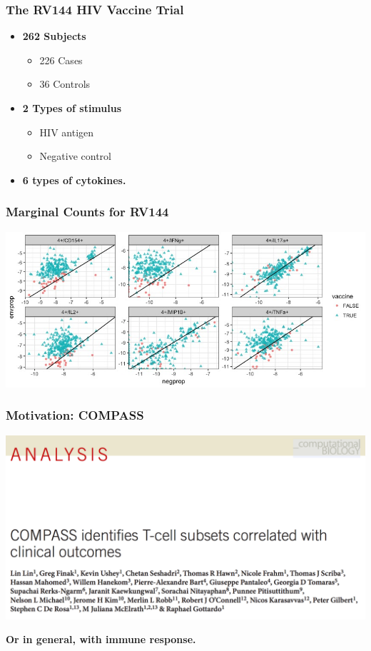 \documentclass{beamer}
\theoremstyle{definition}
\begin{document}
\begin{frame}
\frametitle{The RV144 HIV Vaccine Trial}
\begin{itemize}
\item \textbf{262 Subjects}
	\begin{itemize}
	\item 226 Cases
	\item 36 Controls
	\end{itemize}
\vspace{0.2 cm}
\item \textbf{2 Types of stimulus} 
	\begin{itemize}
	\item HIV antigen
	\item Negative control
	\end{itemize}
\vspace{0.2 cm}
\item \textbf{6 types of cytokines.} 
\end{itemize}
\end{frame}


\begin{frame}
\frametitle{Marginal Counts for RV144}
\begin{center}
\includegraphics[scale=0.4]{figures/marginalScatterNoPost}
\end{center}
\end{frame}


\begin{frame}
\frametitle{Motivation: COMPASS}
\begin{center}
\includegraphics[scale=0.18]{figures/compassCaption}
\end{center}

\pause
\textbf{Or in general, with immune response.}
\end{frame}
\end{document}
